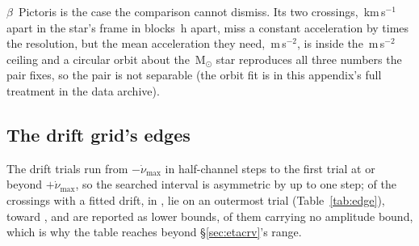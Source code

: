 $\beta$~Pictoris is the case the comparison cannot dismiss. Its two
crossings, \TjBpDvKms\,km\,s$^{-1}$ apart in the star's frame in blocks
\TjBpDtH\,h apart, miss a constant acceleration by \TjBpNSig{} times the
resolution, but the mean acceleration they need, \TjBpAccelReq\,m\,s$^{-2}$,
is inside the \WdAGrid\,m\,s$^{-2}$ ceiling and a circular orbit about the
\EcMassBp\,M$_\odot$ star \citep{Crifo1997} reproduces all three numbers the pair fixes, so the pair is not
separable (the orbit fit is in this appendix's full treatment in the data
archive).


\subsection{The drift grid's edges}
\label{sec:edge}

The drift trials run from $-\dot\nu_{\max}$ in half-channel steps to the
first trial at or beyond $+\dot\nu_{\max}$, so the searched interval is
asymmetric by up to one step; \EgNEdge{} of the \EgNDrift{} crossings with a
fitted drift, in \EgDriftPop{}, lie on an outermost trial (Table~\ref{tab:edge}), toward
\EgEdgeStars, and are reported as lower bounds, \EgNEdgeOut{} of them carrying
no amplitude bound, which is why the table reaches beyond
\S\ref{sec:etacrv}'s range.

\begin{table}
\caption{The crossings whose fitted drift lies on an outermost trial of
their window's own grid. Frequencies are in the star's rest frame, rates in
the observatory frame.}
\label{tab:edge}
\footnotesize

\end{table}
